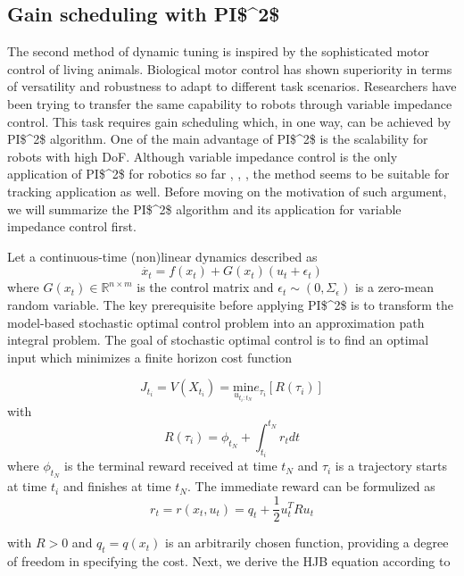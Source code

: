 \subsection{Gain scheduling with \acs{PI$^2$}}
The second method of dynamic tuning is inspired by the sophisticated motor control of living animals. Biological motor control has shown superiority in terms of versatility and robustness to adapt to different task scenarios. Researchers have been trying to transfer the same capability to robots through variable impedance control. This task requires gain scheduling which, in one way, can be achieved by \acs{PI$^2$} algorithm. One of the main advantage of \acs{PI$^2$} is the scalability for robots with high \acs {DoF}. Although variable impedance control is the only application of \acs{PI$^2$} for robotics so far \cite{Buchli2010}, \cite{Buchli6037312}, \cite{buchli2011learning}, the method seems to be suitable for tracking application as well. Before moving on the motivation of such argument, we will summarize the \acs{PI$^2$} algorithm and its application for variable impedance control first.    

Let a continuous-time (non)linear dynamics described as 
\begin{equation}
\dot{x_t} = f(x_t) + G(x_t)(u_t + \epsilon_t)
\end{equation}
where $ G(x_t) \in \mathbb{R}^{n \times m }$ is the control matrix and $ \epsilon_t  \sim (0, \Sigma_{\epsilon}) $ is a zero-mean random variable. The key prerequisite before applying \acs{PI$^2$} is to transform the model-based stochastic optimal control problem into an approximation path integral problem. The goal of stochastic optimal control is to find an optimal input which minimizes a finite horizon cost function

\begin{equation}
J_{t_i} = V(X_{t_i}) = \underset{u_{t_i:t_N}}{\text{min}} e_{\tau_i}[R(\tau_i)]
\end{equation}
with 
\begin{equation}
R(\tau_i) = \phi_{t_N} + \int_{t_i}^{t_N}r_t dt
\end{equation}
where $ \phi_{t_N} $ is the terminal reward received at time $ t_N $ and $ \tau_i $ is a trajectory starts at time $ t_i $ and finishes at time $ t_N $. The immediate reward can be formulized as
\begin{equation}
r_t = r(x_t, u_t) = q_t + \frac{1}{2}u_t^TRu_t
\end{equation}

with $R>0$ and $q_t = q(x_t) $ is an arbitrarily chosen function, providing a degree of freedom in specifying the cost. Next, we derive the \ac {HJB} equation according to  \cite{stengel1994}

